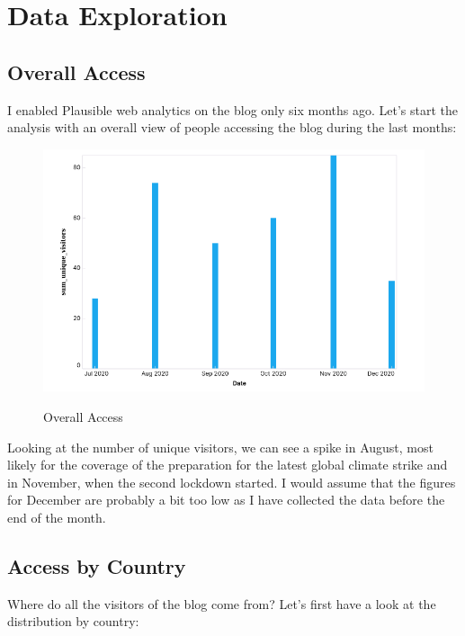 %
%

\pagebreak
\section{Data Exploration}

\onehalfspacing

\subsection{Overall Access}

I enabled Plausible web analytics on the blog only six months ago. Let's start the analysis with an overall view of people accessing the blog during the last months:

\begin{figure}[H]
\centering
\caption {Overall Access}
\includegraphics[width=\linewidth]{images/access-overall.png}
\label{fig:accessOverall}
\end{figure}

Looking at the number of unique visitors, we can see a spike in August, most likely for the coverage of the preparation for the latest global climate strike and in November, when the second lockdown started. I would assume that the figures for December are probably a bit too low as I have collected the data before the end of the month.

\subsection{Access by Country}

Where do all the visitors of the blog come from? Let's first have a look at the distribution by country:

